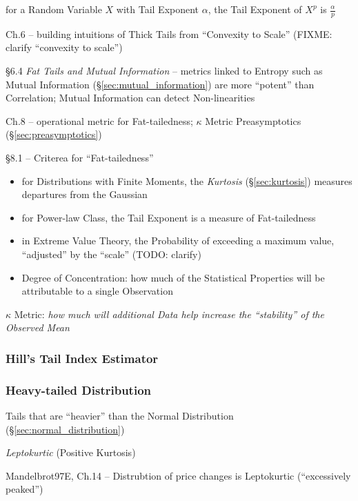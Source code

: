 for a Random Variable $X$ with Tail Exponent $\alpha$, the Tail Exponent of
$X^p$ is $\frac{\alpha}{p}$

Ch.6 -- building intuitions of Thick Tails from ``Convexity to Scale'' (FIXME:
clarify ``convexity to scale'')

\S 6.4 \emph{Fat Tails and Mutual Information}
-- metrics linked to Entropy such as Mutual Information
(\S\ref{sec:mutual_information}) are more ``potent'' than Correlation; Mutual
Information can detect Non-linearities

Ch.8 -- operational metric for Fat-tailedness; $\kappa$ Metric \fist
Preasymptotics (\S\ref{sec:preasymptotics})

\S 8.1 -- Criterea for ``Fat-tailedness''

\begin{itemize}
  \item for Distributions with Finite Moments, the \emph{Kurtosis}
    (\S\ref{sec:kurtosis}) measures departures from the Gaussian
  \item for Power-law Class, the Tail Exponent is a measure of Fat-tailedness
  \item in Extreme Value Theory, the Probability of exceeding a maximum value,
    ``adjusted'' by the ``scale'' (TODO: clarify)
  \item Degree of Concentration: how much of the Statistical Properties will
    be attributable to a single Observation
\end{itemize}

$\kappa$ Metric: \emph{how much will additional Data help increase the
``stability'' of the Observed Mean}



\subsubsection{Hill's Tail Index Estimator}\label{sec:hills_estimator}

\subsubsection{Heavy-tailed Distribution}\label{sec:heavy_tailed}

Tails that are ``heavier'' than the Normal Distribution
(\S\ref{sec:normal_distribution})

\emph{Leptokurtic} (Positive Kurtosis)

Mandelbrot97E, Ch.14 -- Distrubtion of price changes is Leptokurtic
(``excessively peaked'')

